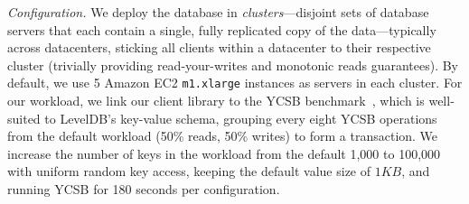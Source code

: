 \vspace{.5em}\noindent\textit{Configuration.} We deploy the database
in \textit{clusters}---disjoint sets of database servers that each
contain a single, fully replicated copy of the data---typically across
datacenters, sticking all clients within a datacenter to their
respective cluster (trivially providing read-your-writes and monotonic
reads guarantees). By default, we use 5 Amazon EC2 \texttt{m1.xlarge}
instances as servers in each cluster. For our workload, we link our
client library to the YCSB benchmark~\cite{ycsb}, which is well-suited
to LevelDB's key-value schema, grouping every eight YCSB operations
from the default workload (50\% reads, 50\% writes) to form a
transaction. We increase the number of keys in the workload from the
default 1,000 to 100,000 with uniform random key access, keeping
the default value size of $1KB$, and running YCSB for 180 seconds per
configuration.

